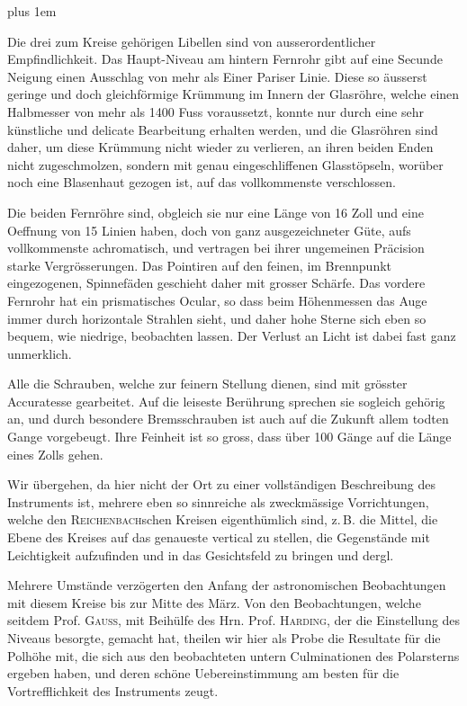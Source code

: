 \begingroup\rightskip=0pt plus 1em \par\indent Die drei zum Kreise gehörigen Libellen sind von ausserordentlicher Empfindlichkeit.
Das Haupt-Niveau am hintern Fernrohr gibt auf eine Secunde Neigung einen Ausschlag von mehr
als Einer Pariser Linie. Diese so äusserst geringe und doch gleichförmige Krümmung im
Innern der Glasröhre, welche einen Halbmesser von mehr als 1400 Fuss voraussetzt, konnte nur
durch eine sehr künstliche und delicate Bearbeitung erhalten werden, und die Glasröhren sind
daher, um diese Krümmung nicht wieder zu verlieren, an ihren beiden Enden nicht
zugeschmolzen, sondern mit genau eingeschliffenen Glasstöpseln, worüber noch eine
Blasenhaut gezogen ist, auf das vollkommenste verschlossen.\par\endgroup

\par\indent Die beiden Fernröhre sind, obgleich sie nur eine Länge von 16 Zoll und eine
Oeffnung von 15 Linien haben, doch von ganz ausgezeichneter Güte, aufs vollkommenste
achromatisch, und vertragen bei ihrer ungemeinen Präcision starke Vergrösserungen. Das
Pointiren auf den feinen, im Brennpunkt eingezogenen, Spinnefäden geschieht daher mit
grosser Schärfe. Das vordere Fernrohr hat ein prismatisches Ocular, so dass beim
Höhenmessen das Auge immer durch horizontale Strahlen sieht, und daher hohe Sterne sich
eben so bequem, wie niedrige, beobachten lassen. Der Verlust an Licht ist dabei fast ganz
unmerklich.

\par\indent Alle die Schrauben, welche zur feinern Stellung dienen, sind mit grösster
Accuratesse gearbeitet. Auf die leiseste Berührung sprechen sie sogleich gehörig an, und
durch besondere Bremsschrauben ist auch auf die Zukunft allem todten Gange vorgebeugt.
Ihre Feinheit ist so gross, dass über 100 Gänge auf die Länge eines Zolls gehen.

\par\indent Wir übergehen, da hier nicht der Ort zu einer vollständigen Beschreibung des
Instruments ist, mehrere eben so sinnreiche als zweckmässige Vorrichtungen, welche den
\textsc{Reichenbach}schen Kreisen eigenthümlich sind, z.\,B. die Mittel, die Ebene des
Kreises auf das genaueste vertical zu stellen, die Gegenstände mit Leichtigkeit
aufzufinden und in das Gesichtsfeld zu bringen und dergl.

\par\indent Mehrere Umstände verzögerten den Anfang der astronomischen Beobachtungen mit
diesem Kreise bis zur Mitte des März. Von den Beobachtungen, welche seitdem Prof.
\textsc{Gauss}, mit Beihülfe des Hrn. Prof. \textsc{Harding}, der die Einstellung des
Niveaus besorgte, gemacht hat, theilen wir hier als Probe die Resultate für die Polhöhe
mit, die sich aus den beobachteten untern Culminationen des Polarsterns ergeben haben,
und deren schöne Uebereinstimmung am besten für die Vortrefflichkeit des Instruments
zeugt.

